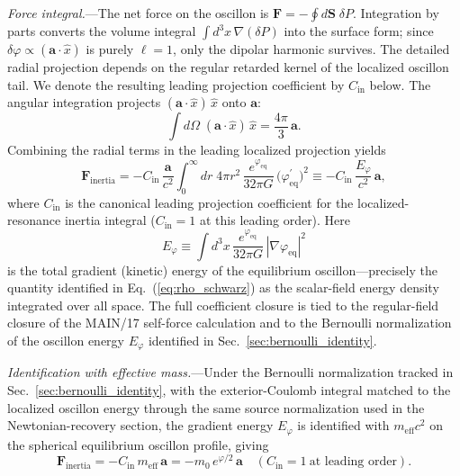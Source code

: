 \documentclass[aps,prd,onecolumn,superscriptaddress,nofootinbib,showpacs,12pt,notitlepage]{revtex4-2}
\newcommand{\meff}{m_{\mathrm{eff}}}
\begin{document}
\textit{Force integral.}---The net force on the oscillon
is $\mathbf{F} = -\oint d\mathbf{S}\;\delta P$.
Integration by parts converts the volume integral
$\int d^{3}x\,\nabla(\delta P)$ into the surface form;
since $\delta\varphi \propto (\mathbf{a}\cdot\hat{x})$
is purely $\ell = 1$, only the dipolar harmonic survives.
The detailed radial projection depends on the regular
retarded kernel of the localized oscillon tail.  We denote
the resulting leading projection coefficient by
$C_{\mathrm{in}}$ below.
The angular integration projects
$(\mathbf{a}\cdot\hat{x})\,\hat{x}$ onto $\mathbf{a}$:
\begin{equation}\label{eq:F_angular}
  \int d\Omega\;(\mathbf{a}\cdot\hat{x})\,\hat{x}
  = \frac{4\pi}{3}\,\mathbf{a}.
\end{equation}
Combining the radial terms in the leading localized
projection yields
\begin{equation}\label{eq:F_radial}
  \mathbf{F}_{\mathrm{inertia}}
  = -C_{\mathrm{in}}\,\frac{\mathbf{a}}{c^{2}}
    \int_{0}^{\infty}\!dr\;4\pi r^{2}\,
    \frac{e^{\varphi_{\mathrm{eq}}}}{32\pi G}\,
    \bigl(\varphi_{\mathrm{eq}}^{\prime}\bigr)^{2}
  \equiv
  -C_{\mathrm{in}}\,\frac{E_{\varphi}}{c^{2}}\,\mathbf{a},
\end{equation}
where $C_{\mathrm{in}}$ is the canonical leading
projection coefficient for the localized-resonance inertia
integral ($C_{\mathrm{in}}=1$ at this leading order).
Here
\begin{equation}\label{eq:E_phi_def}
  E_{\varphi}
  \equiv \int d^{3}x\,
    \frac{e^{\varphi_{\mathrm{eq}}}}{32\pi G}\,
    |\nabla\varphi_{\mathrm{eq}}|^{2}
\end{equation}
is the total gradient (kinetic) energy of the
equilibrium oscillon---precisely the quantity
identified in Eq.~(\ref{eq:rho_schwarz}) as the
scalar-field energy density integrated over all space.
The full coefficient closure is tied to the regular-field
closure of the MAIN/17 self-force calculation and to the
Bernoulli normalization of the oscillon energy
$E_{\varphi}$ identified in
Sec.~\ref{sec:bernoulli_identity}.

\textit{Identification with effective mass.}---Under the
Bernoulli normalization tracked in
Sec.~\ref{sec:bernoulli_identity}, with the exterior-Coulomb
integral matched to the localized oscillon energy through
the same source normalization used in the Newtonian-recovery
section, the gradient energy $E_{\varphi}$ is identified
with $\meff c^{2}$ on the spherical equilibrium oscillon
profile, giving
\begin{equation}\label{eq:F_ma}
  \boxed{
  \mathbf{F}_{\mathrm{inertia}}
  = -C_{\mathrm{in}}\,\meff\,\mathbf{a}
  = -m_{0}\,e^{\varphi/2}\,\mathbf{a}
  \quad (C_{\mathrm{in}}=1\ \text{at leading order}).
  }
\end{equation}
\end{document}
